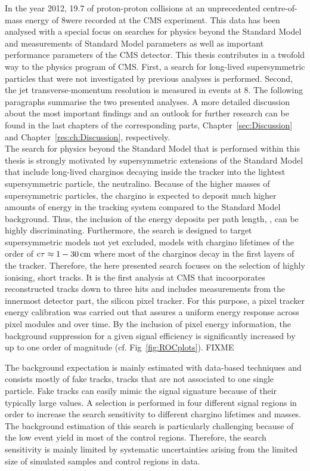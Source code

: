 In the year 2012, 19.7 \fbinv of proton-proton collisions at an unprecedented centre-of-mass energy of 8\tev were recorded at the CMS experiment.
This data has been analysed with a special focus on searches for physics beyond the Standard Model and measurements of Standard Model parameters as well as important performance parameters of the CMS detector.
This thesis contributes in a twofold way to the physics program of CMS.
First, a search for long-lived supersymmetric particles that were not investigated by previous analyses is performed.
Second, the jet transverse-momentum resolution is measured in \GAMJET events at 8\tev.
The following paragraphs summarise the two presented analyses.
A more detailed discussion about the most important findings and an outlook for further research can be found in the last chapters of the corresponding parts, Chapter~\ref{sec:Discussion} and Chapter~\ref{res:ch:Discussion}, respectively.\\

The search for physics beyond the Standard Model that is performed within this thesis is strongly motivated by supersymmetric extensions of the Standard Model that include long-lived charginos decaying inside the tracker into the lightest supersymmetric particle, the neutralino.
Because of the higher masses of supersymmetric particles, the chargino is expected to deposit much higher amounts of energy in the tracking system compared to the Standard Model background.
Thus, the inclusion of the energy deposits per path length, \dedx, can be highly discriminating.
Furthermore, the search is designed to target supersymmetric models not yet excluded, \ie models with chargino lifetimes of the order of $\text{c}\tau \approx 1- 30\,\text{cm}$ where most of the charginos decay in the first layers of the tracker.
Therefore, the here presented search focuses on the selection of highly ionising, short tracks.
It is the first analysis at CMS that incoorporates reconstructed tracks down to three hits and includes \dedx measurements from the innermost detector part, the silicon pixel tracker.
For this purpose, a pixel tracker energy calibration was carried out that assures a uniform energy response across pixel modules and over time.
By the inclusion of pixel energy information, the background suppression for a given signal efficiency is significantly increased by up to one order of magnitude (cf. Fig~\ref{fig:ROCplots}). FIXME

The background expectation is mainly estimated with data-based techniques and consists mostly of fake tracks, \ie tracks that are not associated to one single particle. 
Fake tracks can easily mimic the signal signature because of their typically large \dedx values.
A selection is performed in four different signal regions in order to increase the search sensitivity to different chargino lifetimes and masses.
The background estimation of this search is particularly challenging because of the low event yield in most of the control regions.
Therefore, the search sensitivity is mainly limited by systematic uncertainties arising from the limited size of simulated samples and control regions in data.

